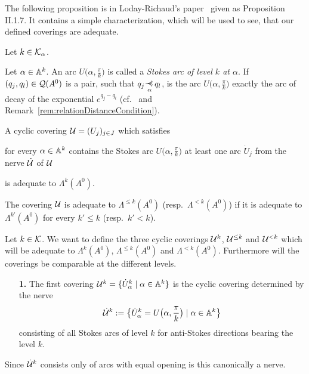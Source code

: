 The following proposition is in Loday-Richaud's paper~\cite{Loday1994} given as
Proposition II.1.7. It contains a simple characterization, which will be used
to see, that our defined coverings are adequate.
\begin{prop}\label{prop:adeqCovCondition}
  Let $k\in\mathcal{K}_\alpha$.
  \begin{s-defn}
    Let $\alpha\in\mathbb{A}^k$.
    An arc $U\bigl(\alpha,\frac{\pi}{k}\bigr)$ is called a \emph{Stokes arc of
      level $k$ at $\alpha$}.
    If $(q_j,q_l)\in\mathcal{Q}(A^0)$ is a pair, such that $q_j\myrel{\alpha}q_l$, is
    the arc $U\bigl(\alpha,\frac{\pi}{k}\bigr)$ exactly the arc of decay of the
    exponential $e^{q_j-q_l}$ (cf.~\cite[5269]{Loday2004} and
    Remark~\ref{rem:relationDistanceCondition}).
  \end{s-defn}
  A cyclic covering $\mathcal{U}=(U_j)_{j\in J}$ which satisfies
  \begin{einr}
    for every $\alpha\in\mathbb{A}^k$ contains the Stokes arc
    $U\bigl(\alpha,\frac{\pi}{k}\bigr)$ at least one arc $\dot U_j$ from the
    nerve $\dot{\mathcal{U}}$ of $\mathcal{U}$
  \end{einr}
  is adequate to $\Lambda^k(A^0)$.

  The covering $\mathcal{U}$ is adequate to $\Lambda^{\leq k}(A^0)$ (resp.\
  $\Lambda^{<k}(A^0)$) if it is adequate to $\Lambda^{k'}(A^0)$ for every
  $k'\leq k$ (resp.\ $k'<k$).
\end{prop}
\begin{comment}
  \begin{proof}
    Show that for every $U_j,U_l\in\cU$ is
    \[
      H^1(U_j\cap U_l;\Lambda^k(A^0))=0 \,.
    \]
    Then the theorem of Leray implies that
    $H^1(S^0;\Lambda^k(A^0))=H^1(\cU;\Lambda^k(A^0))$
  \end{proof}
\end{comment}

Let $k\in\mathcal{K}$.
We want to define the three cyclic coverings $\mathcal{U}^{k}$, $\mathcal{U}^{\leq k}$ and
$\mathcal{U}^{<k}$ which will be adequate to $\Lambda^k(A^0)$, $\Lambda^{\leq k}(A^0)$
and $\Lambda^{<k}(A^0)$. Furthermore will the coverings be comparable at the
different levels.

\begin{itemize}
\item[\textbf{1.}] The first covering
  $\mathcal{U}^{k}=\{\dot U_\alpha^k\mid\alpha\in\mathbb{A}^k\}$ is the cyclic covering
  determined by the nerve
  \[
    \dot{\mathcal{U}}^k:=
    \bigl\{\dot U_\alpha^k=U\bigl(\alpha,\frac{\pi}{k}\bigr)\mid\alpha\in\mathbb{A}^k\bigr\}
  \]
  consisting of all Stokes arcs of level $k$ for anti-Stokes directions bearing
  the level $k$.
\end{itemize}
Since $\dot{\mathcal{U}}^k$ consists only of arcs with equal opening is this canonically a
nerve.

